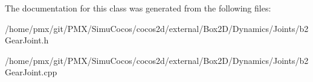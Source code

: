 The documentation for this class was generated from the following files\+:\begin{DoxyCompactItemize}
\item 
/home/pmx/git/\+P\+M\+X/\+Simu\+Cocos/cocos2d/external/\+Box2\+D/\+Dynamics/\+Joints/b2\+Gear\+Joint.\+h\item 
/home/pmx/git/\+P\+M\+X/\+Simu\+Cocos/cocos2d/external/\+Box2\+D/\+Dynamics/\+Joints/b2\+Gear\+Joint.\+cpp\end{DoxyCompactItemize}
